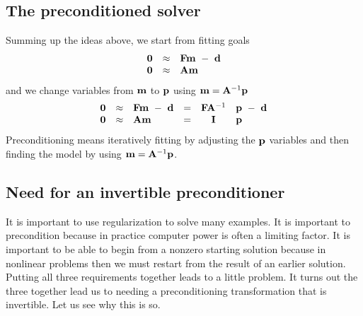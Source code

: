 \subsection{The preconditioned solver}
Summing up the ideas above,
we start from fitting goals
\begin{equation}
\begin{array}{lll}
\label{eq:main}
\bold 0 &\approx& \bold F \bold m \ -\  \bold d \\
\bold 0 &\approx& \bold A \bold m
\end{array}
\end{equation}
and we change variables from
$\bold m$ to $\bold p$ using
$\bold m = \bold A^{-1} \bold p$
\begin{equation}
\begin{array}{llllcl}
\bold 0 &\approx &  \bold F \bold m \ -\  \bold d   &=&
    \bold F  \bold A^{-1} &\bold p  \ -\  \bold d
\\
\bold 0 &\approx &  \bold A \bold m       &=&   \bold I        & \bold p
\end{array}
\label{eqn:precsummary}
\end{equation}
Preconditioning means iteratively fitting
by adjusting the $\bold p$ variables
and then finding the model by using
$\bold m = \bold A^{-1} \bold p$.

\begin{comment}
A new reusable
preconditioned solver is
the module \texttt{solver_prc} \vpageref{lst:solver_prc}.
Likewise the modeling operator $\bold F$ is called \texttt{Fop}
and the smoothing operator $\bold A^{-1}$ is called \texttt{Sop}.
Details of the code are only slightly different from
the regularized solver
\texttt{solver-reg} \vpageref{lst:solver-reg}.

\moddex{solver_prc}{Preconditioned solver}
\end{comment}


\subsection{Need for an invertible preconditioner}
It is important to use regularization to solve many examples.
It is important to precondition because in practice computer power
is often a limiting factor.
It is important to be able to begin from a nonzero starting solution
because in nonlinear problems then we must restart from 
the result of an earlier solution.
Putting all three requirements together leads to a little problem.
It turns out the three together lead us to needing 
a preconditioning transformation that is invertible.
Let us see why this is so.

